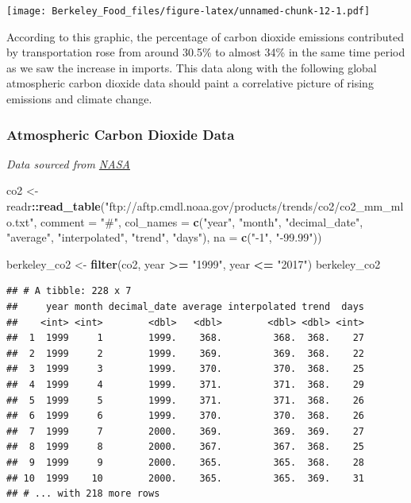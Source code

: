 \documentclass[]{article}
\newenvironment{Shaded}{\begin{snugshade}}{\end{snugshade}}
\newcommand{\KeywordTok}[1]{\textcolor[rgb]{0.13,0.29,0.53}{\textbf{#1}}}
\newcommand{\DataTypeTok}[1]{\textcolor[rgb]{0.13,0.29,0.53}{#1}}
\newcommand{\StringTok}[1]{\textcolor[rgb]{0.31,0.60,0.02}{#1}}
\newcommand{\OperatorTok}[1]{\textcolor[rgb]{0.81,0.36,0.00}{\textbf{#1}}}
\newcommand{\NormalTok}[1]{#1}
\begin{document}
\texttt{[image: Berkeley\_Food\_files/figure-latex/unnamed-chunk-12-1.pdf]}

According to this graphic, the percentage of carbon dioxide emissions
contributed by transportation rose from around 30.5\% to almost 34\% in
the same time period as we saw the increase in imports. This data along
with the following global atmospheric carbon dioxide data should paint a
correlative picture of rising emissions and climate change.

\subsubsection{Atmospheric Carbon Dioxide
Data}\label{atmospheric-carbon-dioxide-data}

\emph{Data sourced from
\href{https://climate.nasa.gov/vital-signs/carbon-dioxide/}{NASA}}

\begin{Shaded}
\begin{Highlighting}[]
\NormalTok{co2 <-}
\NormalTok{readr}\OperatorTok{::}\KeywordTok{read_table}\NormalTok{(}\StringTok{"ftp://aftp.cmdl.noaa.gov/products/trends/co2/co2_mm_mlo.txt"}\NormalTok{,}
                  \DataTypeTok{comment =} \StringTok{"#"}\NormalTok{,}
                  \DataTypeTok{col_names =} \KeywordTok{c}\NormalTok{(}\StringTok{"year"}\NormalTok{, }\StringTok{"month"}\NormalTok{, }\StringTok{"decimal_date"}\NormalTok{, }\StringTok{"average"}\NormalTok{,}
                                \StringTok{"interpolated"}\NormalTok{, }\StringTok{"trend"}\NormalTok{, }\StringTok{"days"}\NormalTok{),}
                  \DataTypeTok{na =} \KeywordTok{c}\NormalTok{(}\StringTok{"-1"}\NormalTok{, }\StringTok{"-99.99"}\NormalTok{))}
\end{Highlighting}
\end{Shaded}

\begin{Shaded}
\begin{Highlighting}[]
\NormalTok{berkeley_co2 <-}\StringTok{ }\KeywordTok{filter}\NormalTok{(co2, year }\OperatorTok{>=}\StringTok{ "1999"}\NormalTok{, year }\OperatorTok{<=}\StringTok{ "2017"}\NormalTok{)}
\NormalTok{berkeley_co2}
\end{Highlighting}
\end{Shaded}

\begin{verbatim}
## # A tibble: 228 x 7
##     year month decimal_date average interpolated trend  days
##    <int> <int>        <dbl>   <dbl>        <dbl> <dbl> <int>
##  1  1999     1        1999.    368.         368.  368.    27
##  2  1999     2        1999.    369.         369.  368.    22
##  3  1999     3        1999.    370.         370.  368.    25
##  4  1999     4        1999.    371.         371.  368.    29
##  5  1999     5        1999.    371.         371.  368.    26
##  6  1999     6        1999.    370.         370.  368.    26
##  7  1999     7        2000.    369.         369.  369.    27
##  8  1999     8        2000.    367.         367.  368.    25
##  9  1999     9        2000.    365.         365.  368.    28
## 10  1999    10        2000.    365.         365.  369.    31
## # ... with 218 more rows
\end{verbatim}
\end{document}
